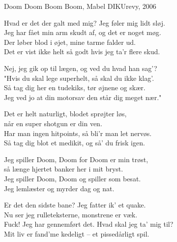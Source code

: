 \begin{song}{Doom Doom}
  {} %
  {Boom Boom, Mabel} %
  {} %
  {DIKUrevy, 2006} %
  {\NotCCLIed} %

  \begin{SBVerse}
    Hvad er det der galt med mig? Jeg føler mig lidt sløj.\\
    Jeg har fået min arm skudt af, og det er noget møg.\\
    Der løber blod i øjet, mine tarme falder ud.\\
    Det er vist ikke helt så godt hvis jeg ta'r flere skud.
  \end{SBVerse}

  \begin{SBVerse}
    Nej, jeg gik op til lægen, og ved du hvad han sag'?\\
    "Hvis du skal lege superhelt, så skal du ikke klag'.\\
    Så tag dig her en tudekiks, tør øjnene og skær.\\
    Jeg ved jo at din motorsav den står dig meget nær."
  \end{SBVerse}

  \begin{SBSection*}
    Det er helt naturligt, blodet sprøjter løs,\\
    når en super shotgun er din ven.\\
    Har man ingen hitpoints, så bli'r man let nervøs.\\
    Så tag dig blot et medikit, og så' du frisk igen.
  \end{SBSection*}

  \begin{SBChorus}
    Jeg spiller Doom, Doom for Doom er min trøst,\\
    så længe hjertet banker her i mit bryst.\\
    Jeg spiller Doom, Doom og spiller som besat.\\
    Jeg lemlæster og myrder dag og nat.
  \end{SBChorus}

  \begin{SBVerse}
    Er det den sidste bane? Jeg fatter ik' et quake.\\
    Nu ser jeg rulleteksterne, monstrene er væk.\\
    Fuck! Jeg har gennemført det. Hvad skal jeg ta' mig til?\\
    Mit liv er fand'me kedeligt -- et pissedårligt spil.
  \end{SBVerse}


\end{song}
